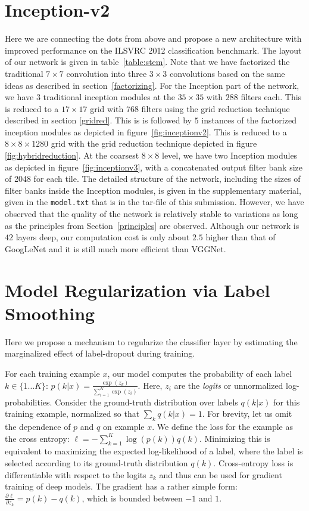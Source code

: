\documentclass[10pt,twocolumn,letterpaper]{article}
\begin{document}
\section{Inception-v2}
\label{revisited}
Here we are connecting the dots from above and propose a new
architecture with improved performance on the ILSVRC 2012
classification benchmark.
The layout of our network is given in table~\ref{table:stem}.
Note that we have factorized the traditional $7\times 7$ convolution into
three $3\times 3$ convolutions based on the same ideas as described in
section~\ref{factorizing}.
For the Inception part of the network, we have $3$ traditional
inception modules at  the $35\times 35$ with $288$ filters each.
This is reduced to a $17\times 17$ grid with $768$ filters using the
grid reduction technique described in section \ref{gridred}. This is
is followed by $5$ instances of the factorized inception modules as
depicted in figure~\ref{fig:inceptionv2}. This is reduced to a $8\times 8\times 1280$
grid with the grid reduction technique depicted in figure \ref{fig:hybridreduction}.
At the coarsest $8\times 8$ level, we have two Inception modules as depicted
in figure~\ref{fig:inceptionv3}, with a concatenated output filter bank size of
2048 for each tile. The detailed structure of the
network, including the sizes of filter banks inside the Inception modules,
is given in the supplementary material, given in the {\tt model.txt} that is in
the tar-file of this submission. However, we have observed that
the quality of the network is relatively stable to variations
as long as the principles from Section~\ref{principles} are observed.
Although our network is $42$ layers deep, our computation cost is only
about $2.5$ higher than that of GoogLeNet and it is still much more efficient than
VGGNet.

 \section{Model Regularization via Label Smoothing}
\label{smoothing}
Here we propose a mechanism to regularize the classifier layer by
estimating the marginalized effect of label-dropout during training.

For each training example $x$, our model computes the probability of each label
$k\in\{1\ldots K\}$: $p(k|x) = \frac{\exp(z_k)}{\sum_{i=1}^K \exp(z_i)}$. Here,
$z_i$ are the {\em logits} or unnormalized log-probabilities. Consider the
ground-truth distribution over labels $q(k|x)$ for this training example,
normalized so that $\sum_k q(k|x) = 1$. For brevity, let us omit the dependence
of $p$ and $q$ on example $x$. We define the loss for the example as the
cross entropy: $\ell = -\sum_{k=1}^K \log(p(k)) q(k)$. Minimizing this is
equivalent to maximizing the expected log-likelihood of a label, where the label
is selected according to its ground-truth distribution $q(k)$. Cross-entropy
loss is differentiable with respect to the logits $z_k$ and thus can be used for
gradient training of deep models. The gradient has a rather simple form:
$\frac{\partial\ell}{\partial z_k} = p(k) - q(k)$, which is bounded between $-1$
and $1$.
\end{document}
